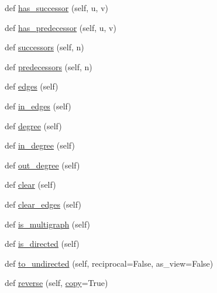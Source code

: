 \begin{DoxyCompactItemize}
\item 
def \hyperlink{classnetworkx_1_1classes_1_1digraph_1_1DiGraph_a674428bd3e3d53f26ebaa456a669cd42}{has\+\_\+successor} (self, u, v)
\item 
def \hyperlink{classnetworkx_1_1classes_1_1digraph_1_1DiGraph_a62a8bd8026cec40400db72e222b2e4e1}{has\+\_\+predecessor} (self, u, v)
\item 
def \hyperlink{classnetworkx_1_1classes_1_1digraph_1_1DiGraph_aa39a32232c9918536e5238f5ad1b481c}{successors} (self, n)
\item 
def \hyperlink{classnetworkx_1_1classes_1_1digraph_1_1DiGraph_a6e32545530bc78e88c135642983c0205}{predecessors} (self, n)
\item 
def \hyperlink{classnetworkx_1_1classes_1_1digraph_1_1DiGraph_adc0f55268d29fba843fc4a24ada556df}{edges} (self)
\item 
def \hyperlink{classnetworkx_1_1classes_1_1digraph_1_1DiGraph_a6da61e2c6bc041cd67c928e62986b828}{in\+\_\+edges} (self)
\item 
def \hyperlink{classnetworkx_1_1classes_1_1digraph_1_1DiGraph_acebffe942867936552e382da7308e02a}{degree} (self)
\item 
def \hyperlink{classnetworkx_1_1classes_1_1digraph_1_1DiGraph_a95ec1bf606ee36aae19bf6d1a4b2b7bf}{in\+\_\+degree} (self)
\item 
def \hyperlink{classnetworkx_1_1classes_1_1digraph_1_1DiGraph_a5c1d8ff06c6934905351b20ee01cd44a}{out\+\_\+degree} (self)
\item 
def \hyperlink{classnetworkx_1_1classes_1_1digraph_1_1DiGraph_a6690d460bd07932e64a82e5d0cad8812}{clear} (self)
\item 
def \hyperlink{classnetworkx_1_1classes_1_1digraph_1_1DiGraph_a7d99a80ec69ee5f0c3e2eef6485a8f27}{clear\+\_\+edges} (self)
\item 
def \hyperlink{classnetworkx_1_1classes_1_1digraph_1_1DiGraph_ae07a320259a073de16fb41614f6955df}{is\+\_\+multigraph} (self)
\item 
def \hyperlink{classnetworkx_1_1classes_1_1digraph_1_1DiGraph_a927903698c9c6780c965ee39da9bc8cb}{is\+\_\+directed} (self)
\item 
def \hyperlink{classnetworkx_1_1classes_1_1digraph_1_1DiGraph_ad8f07900eed019061ead5d2e0e206666}{to\+\_\+undirected} (self, reciprocal=False, as\+\_\+view=False)
\item 
def \hyperlink{classnetworkx_1_1classes_1_1digraph_1_1DiGraph_a48947d2a848049194da0bdab4ae0f972}{reverse} (self, \hyperlink{classnetworkx_1_1classes_1_1graph_1_1Graph_af5b1281d6428d14a74984c699e748eb9}{copy}=True)
\end{DoxyCompactItemize}
